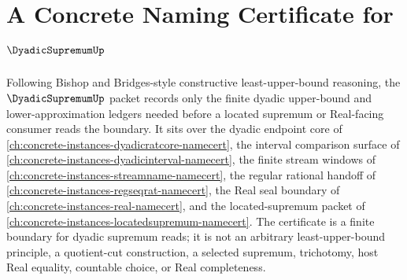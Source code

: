 \chapter{A Concrete Naming Certificate for $\DyadicSupremumUp$}
\label{ch:concrete-instances-dyadic-supremum-namecert}

Following Bishop and Bridges-style constructive least-upper-bound reasoning, the $\DyadicSupremumUp$ packet records only the finite dyadic upper-bound and lower-approximation ledgers needed before a located supremum or Real-facing consumer reads the boundary. It sits over the dyadic endpoint core of \autoref{ch:concrete-instances-dyadicratcore-namecert}, the interval comparison surface of \autoref{ch:concrete-instances-dyadicinterval-namecert}, the finite stream windows of \autoref{ch:concrete-instances-streamname-namecert}, the regular rational handoff of \autoref{ch:concrete-instances-regseqrat-namecert}, the Real seal boundary of \autoref{ch:concrete-instances-real-namecert}, and the located-supremum packet of \autoref{ch:concrete-instances-locatedsupremum-namecert}. The certificate is a finite boundary for dyadic supremum reads; it is not an arbitrary least-upper-bound principle, a quotient-cut construction, a selected supremum, trichotomy, host Real equality, countable choice, or Real completeness.

